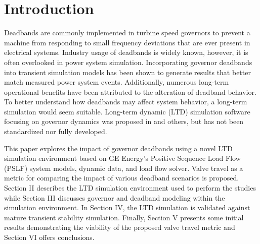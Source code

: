\section{Introduction}
Deadbands are commonly implemented in turbine speed governors to prevent a machine from responding to small frequency deviations that are ever present in electrical systems.
Industry usage of deadbands is widely known, however, it is often overlooked in power system simulation.
Incorporating governor deadbands into transient simulation models has been shown to generate results that better match measured power system events\cite{kou2016}.
Additionally, numerous long-term operational benefits have been attributed to the alteration of deadband behavior\cite{nercFRI2012}.
To better understand how deadbands may affect system behavior, a long-term simulation would seem suitable.
Long-term dynamic (LTD) simulation software focusing on governor dynamics was proposed in \cite{AGCCresap} and others, but has not been standardized nor fully developed.


This paper explores the impact of governor deadbands using a novel LTD simulation environment based on GE Energy's Positive Sequence Load Flow (PSLF) system models, dynamic data, and load flow solver. 
Valve travel as a metric for comparing the impact of various deadband scenarios is proposed. 
Section II describes the LTD simulation environment used to perform the studies while
Section III discusses governor and deadband modeling within the simulation environment. 
In Section IV, the LTD simulation is validated against mature transient stability simulation. 
Finally, Section V presents some initial results demonstrating the viability of the proposed valve travel metric and Section VI offers conclusions.
